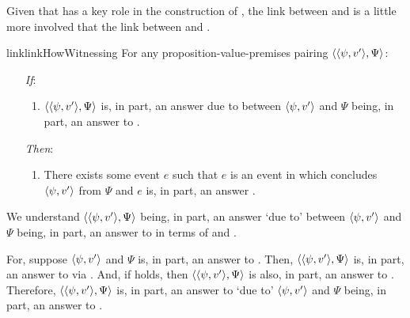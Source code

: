 \begin{note}
  Given that \qWhyVnP{} has a key role in the construction of \qHowV{}, the link between \qHow{} and \qHowV{} is a little more involved that the link between \qWhyVnP{} and \qWhy{}.

  \begin{restatable}{link}{linkHowWitnessing}
    \label{link:how-witnessing}
    For any proposition-value-premises pairing \(\langle \langle \psi, v' \rangle, \Psi \rangle\):
    \begin{itemize}
    \item[\emph{If}:]
      \begin{enumerate}[label=\alph*., ref=(\alph*)]
      \item
        \(\langle \langle \psi, v' \rangle, \Psi \rangle\) is, in part, an answer \qHow{} due to \ros{} between \(\langle \psi, v' \rangle\) and \(\Psi\) being, in part, an answer to \qWhyVnP{}.
      \end{enumerate}
    \item[\emph{Then}:]
      \begin{enumerate}[label=\alph*., ref=(\alph*), resume]
      \item
        There exists some event \(e\) such that \(e\) is an event in which \vAgent{} concludes \(\langle \psi, v' \rangle\) from \(\Psi\) and \(e\) is, in part, an answer \qHowV{}.
      \end{enumerate}
    \end{itemize}
    \vspace{-\baselineskip}
  \end{restatable}

  We understand  \(\langle \langle \psi, v' \rangle, \Psi \rangle\) being, in part, an answer \qHow{} `due to' \ros{} between \(\langle \psi, v' \rangle\) and \(\Psi\) being, in part, an answer to \qWhyVnP{} in terms of \linkW{} and \issueInclusion{}.

  For, suppose \(\langle \psi, v' \rangle\) and \(\Psi\) is, in part, an answer to \qWhyVnP{}.
  Then, \(\langle \langle \psi, v' \rangle, \Psi \rangle\) is, in part, an answer to \qWhy{} via \linkW{}.
  And, if \issueInclusion{} holds, then \(\langle \langle \psi, v' \rangle, \Psi \rangle\) is also, in part, an answer to \qHow{}.
  Therefore, \(\langle \langle \psi, v' \rangle, \Psi \rangle\) is, in part, an answer to \qHow{} `due to' \(\langle \psi, v' \rangle\) and \(\Psi\) being, in part, an answer to \qWhyVnP{}.
\end{note}

